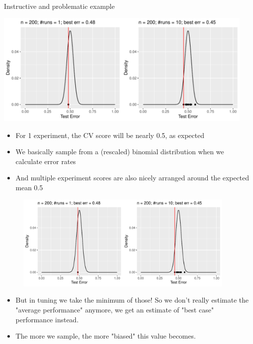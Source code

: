 \begin{vbframe}{Instructive and problematic example}
\begin{knitrout}\scriptsize
{}\color{fgcolor}

{\centering \includegraphics[width=0.95\textwidth]{figure/cart_tuning_nestintro_2} 

}


\end{knitrout}

\begin{itemize}
\item For 1 experiment, the CV score will be nearly 0.5, as expected
\item We basically sample from a (rescaled) binomial distribution when we calculate error rates
\item And multiple experiment scores are also nicely arranged around the expected mean 0.5
\end{itemize}

\framebreak

\begin{figure}
\centering 
\includegraphics[width=0.95\textwidth]{figure/cart_tuning_nestintro_2}
\end{figure}

\begin{itemize}
\item But in tuning we take the minimum of those! So we don't really estimate the "average performance" anymore, we get an estimate of "best case" performance instead.
\item The more we sample, the more "biased" this value becomes. 
\end{itemize}
\end{vbframe}

